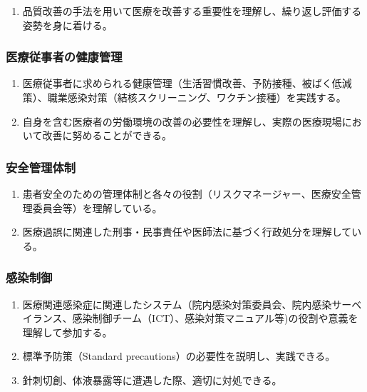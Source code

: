 \begin{enumerate}
\def\labelenumi{\arabic{enumi}.}
\tightlist
\item
  品質改善の手法を用いて医療を改善する重要性を理解し、繰り返し評価する姿勢を身に着ける。
\end{enumerate}

\hypertarget{ux533bux7642ux5f93ux4e8bux8005ux306eux5065ux5eb7ux7ba1ux7406-1}{%
\subsubsection{医療従事者の健康管理}\label{ux533bux7642ux5f93ux4e8bux8005ux306eux5065ux5eb7ux7ba1ux7406-1}}

\begin{enumerate}
\def\labelenumi{\arabic{enumi}.}
\tightlist
\item
  医療従事者に求められる健康管理（生活習慣改善、予防接種、被ばく低減策）、職業感染対策（結核スクリーニング、ワクチン接種）を実践する。
\item
  自身を含む医療者の労働環境の改善の必要性を理解し、実際の医療現場において改善に努めることができる。
\end{enumerate}

\hypertarget{ux5b89ux5168ux7ba1ux7406ux4f53ux5236-1}{%
\subsubsection{安全管理体制}\label{ux5b89ux5168ux7ba1ux7406ux4f53ux5236-1}}

\begin{enumerate}
\def\labelenumi{\arabic{enumi}.}
\tightlist
\item
  患者安全のための管理体制と各々の役割（リスクマネージャー、医療安全管理委員会等）を理解している。
\item
  医療過誤に関連した刑事・民事責任や医師法に基づく行政処分を理解している。
\end{enumerate}

\hypertarget{ux611fux67d3ux5236ux5fa1-1}{%
\subsubsection{感染制御}\label{ux611fux67d3ux5236ux5fa1-1}}

\begin{enumerate}
\def\labelenumi{\arabic{enumi}.}
\tightlist
\item
  医療関連感染症に関連したシステム（院内感染対策委員会、院内感染サーベイランス、感染制御チーム（ICT）、感染対策マニュアル等)の役割や意義を理解して参加する。
\item
  標準予防策（Standard precautions）の必要性を説明し、実践できる。
\item
  針刺切創、体液暴露等に遭遇した際、適切に対処できる。
\end{enumerate}

